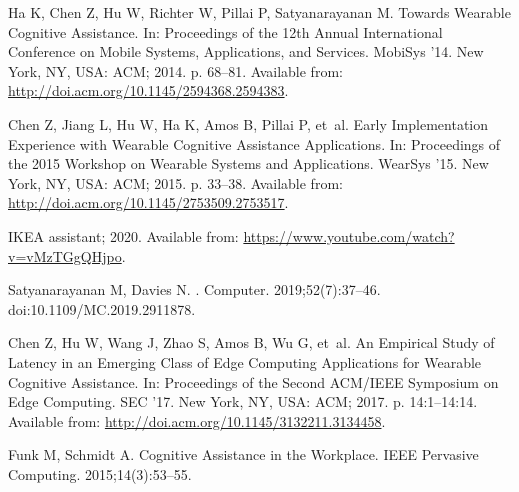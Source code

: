 \documentclass[10pt,letterpaper]{article}
\begin{document}
\nolinenumbers%

%
%
% 

% 
% 
\begin{thebibliography}{10}

  Ha K, Chen Z, Hu W, Richter W, Pillai P, Satyanarayanan M.
  \newblock Towards Wearable Cognitive Assistance.
  \newblock In: Proceedings of the 12th Annual International Conference on Mobile
    Systems, Applications, and Services. MobiSys '14. New York, NY, USA: ACM;
    2014. p. 68--81.
  \newblock Available from: \url{http://doi.acm.org/10.1145/2594368.2594383}.
  
  Chen Z, Jiang L, Hu W, Ha K, Amos B, Pillai P, et~al.
  \newblock Early Implementation Experience with Wearable Cognitive Assistance
    Applications.
  \newblock In: Proceedings of the 2015 Workshop on Wearable Systems and
    Applications. WearSys '15. New York, NY, USA: ACM; 2015. p. 33--38.
  \newblock Available from: \url{http://doi.acm.org/10.1145/2753509.2753517}.
  
  {IKEA assistant}; 2020.
  \newblock Available from: \url{https://www.youtube.com/watch?v=vMzTGgQHjpo}.
  
  {Satyanarayanan} M, {Davies} N.
  .
  \newblock Computer. 2019;52(7):37--46.
  \newblock doi:{10.1109/MC.2019.2911878}.
  
  Chen Z, Hu W, Wang J, Zhao S, Amos B, Wu G, et~al.
  \newblock An Empirical Study of Latency in an Emerging Class of Edge Computing
    Applications for Wearable Cognitive Assistance.
  \newblock In: Proceedings of the Second ACM/IEEE Symposium on Edge Computing.
    SEC '17. New York, NY, USA: ACM; 2017. p. 14:1--14:14.
  \newblock Available from: \url{http://doi.acm.org/10.1145/3132211.3134458}.
  
  {Funk} M, {Schmidt} A.
  \newblock Cognitive Assistance in the Workplace.
  \newblock IEEE Pervasive Computing. 2015;14(3):53--55.
  

\end{thebibliography}
\end{document}
